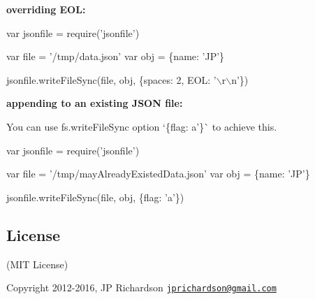 {\bfseries overriding E\+OL\+:}


\begin{DoxyCode}
var jsonfile = require('jsonfile')

var file = '/tmp/data.json'
var obj = \{name: 'JP'\}

jsonfile.writeFileSync(file, obj, \{spaces: 2, EOL: '\(\backslash\)r\(\backslash\)n'\})
\end{DoxyCode}


{\bfseries appending to an existing J\+S\+ON file\+:}

You can use {\ttfamily fs.\+write\+File\+Sync} option `\{flag\+: \textquotesingle{}a'\}\`{} to achieve this.


\begin{DoxyCode}
var jsonfile = require('jsonfile')

var file = '/tmp/mayAlreadyExistedData.json'
var obj = \{name: 'JP'\}

jsonfile.writeFileSync(file, obj, \{flag: 'a'\})
\end{DoxyCode}


\subsection*{License }

(M\+IT License)

Copyright 2012-\/2016, JP Richardson \href{mailto:jprichardson@gmail.com}{\tt jprichardson@gmail.\+com} 